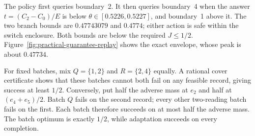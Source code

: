 \documentclass[12pt]{article}
\begin{document}
The policy first queries boundary~2. It then queries boundary~4 when the
answer $t=(C_2-C_0)/E$ is below $\theta\in[0.5226,0.5227]$, and boundary~1
above it. The two branch bounds are $0.47743079$ and $0.4774$; either action
is safe within the switch enclosure. Both bounds are below the required
$J\leq1/2$. Figure~\ref{fig:practical-guarantee-replay} shows the exact
envelope, whose peak is about $0.47734$.

For fixed batches, mix $Q=\{1,2\}$ and $R=\{2,4\}$ equally. A rational
cover certificate shows that these batches cannot both fail on any feasible
record, giving success at least $1/2$. Conversely, put half the adverse mass
at $e_2$ and half at $(e_4+e_5)/2$. Batch $Q$ fails on the second record;
every other two-reading batch fails on the first. Each batch therefore
succeeds on at most half the adverse mass. The batch optimum is exactly
$1/2$, while adaptation succeeds on every completion.
\end{document}
